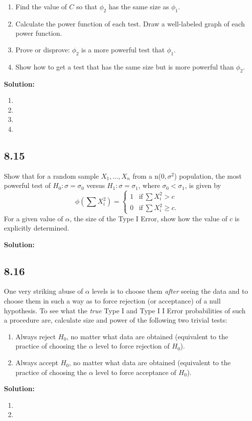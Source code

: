 \documentclass[11pt]{article}
\newcommand{\Sol}{\par {\bf Solution:}}
\newcommand{\sample}[1]{#1_1 , \dots , #1_n}
\begin{document}
\begin{enumerate}[label=(\alph*)]
    \item Find the value of $C$ so that $\phi_2$ has the same size as $\phi_1$.
    \item Calculate the power function of each test. Draw a well-labeled graph of each power function.
    \item Prove or disprove: $\phi_2$ is a more powerful test that $\phi_1$.
    \item Show how to get a test that has the same size but is more powerful than $\phi_2$.
\end{enumerate}

\Sol
\begin{enumerate}[label=(\alph*)]
    \item
    \item
    \item
    \item
\end{enumerate}

\subsection*{8.15}
Show that for a random sample $\sample{X}$ from a n($0, \sigma^2$) population, the most powerful test of $H_0: \sigma = \sigma_0$ versus $H_1: \sigma = \sigma_1$, where $\sigma_0 < \sigma_1$, is given by 
$$
\phi(\sum X_i^2) = \begin{cases*} 
1 & \text{if} ~ \sum X_i^2 > c \\ 
0 & \text{if} ~ \sum X_i^2 \ge c.
\end{cases*}
$$
For a given value of $\alpha$, the size of the Type I Error, show how the value of $c$ is explicitly determined.

\Sol


\subsection*{8.16}
One very striking abuse of $\alpha$ levels is to choose them \emph{after} seeing the data and to choose them in such a way as to force rejection (or acceptance) of a null hypothesis. To see what the \emph{true} Type I and Type I I Error probabilities of such a procedure are, calculate size and power of the following two trivial tests:

\begin{enumerate}[label=(\alph*)]
    \item Always reject $H_0$, no matter what data are obtained (equivalent to the practice
of choosing the $\alpha$ level to force rejection of $H_0$).
    \item Always accept $H_0$, no matter what data are obtained (equivalent to the practice
of choosing the $\alpha$ level to force acceptance of $H_0$).
\end{enumerate}

\Sol

\begin{enumerate}[label=(\alph*)]
    \item
    \item
\end{enumerate}
\end{document}
